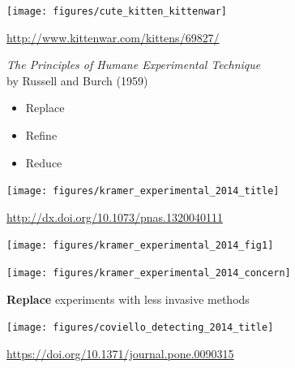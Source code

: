 \documentclass[aspectratio=169]{beamer}
\begin{document}
\begin{frame}

\begin{center}
\texttt{[image: figures/cute\_kitten\_kittenwar]}
\end{center}

\vfill
\tiny{\url{http://www.kittenwar.com/kittens/69827/}}

\end{frame}
\begin{frame}

\begin{center}
\Large{\textit{The Principles of Humane Experimental Technique}}\\
by Russell and Burch (1959)
\end{center}

\vfill

\LARGE{
\begin{itemize}
  \item Replace
  \item Refine
  \item Reduce
\end{itemize}
}

\end{frame}
\begin{frame}

\begin{center}
\texttt{[image: figures/kramer\_experimental\_2014\_title]}
\end{center}

\vfill
\tiny{\url{http://dx.doi.org/10.1073/pnas.1320040111}}

\end{frame}
\begin{frame}

\begin{center}
\texttt{[image: figures/kramer\_experimental\_2014\_fig1]}
\end{center}

\end{frame}
\begin{frame}

\begin{center}
\texttt{[image: figures/kramer\_experimental\_2014\_concern]}
\end{center}

\end{frame}
\begin{frame}

\begin{framed}
\textbf{Replace} experiments with less invasive methods
\end{framed}

\pause
\begin{center}
\texttt{[image: figures/coviello\_detecting\_2014\_title]}
\end{center}

\vfill
\tiny{\url{https://doi.org/10.1371/journal.pone.0090315}}

\end{frame}
\end{document}
